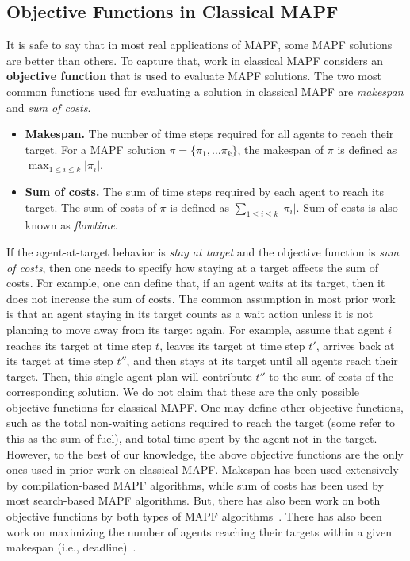 \documentclass[letterpaper]{article} %
\begin{document}
\subsection{Objective Functions in Classical MAPF}
It is safe to say that in most real applications of MAPF,
some MAPF solutions are better than others.
To capture that, work in classical MAPF considers an \textbf{objective function}
that is used to evaluate MAPF solutions.
The two most common functions used for evaluating a solution in classical MAPF are \emph{makespan} and \emph{sum of costs}.
\begin{itemize}
\item \textbf{Makespan.} The number of time steps required for all agents to reach their target.
For a MAPF solution $\pi=\{\pi_1, \ldots \pi_k\}$, the makespan of $\pi$ is defined as $\max_{1\leq i\leq k} |\pi_i|$.
\item \textbf{Sum of costs.} The sum of time steps required by each agent to reach its target. The sum of costs of $\pi$ is defined as $\sum_{1\leq i\leq k} |\pi_i|$.
Sum of costs is also known as \emph{flowtime}.
\end{itemize}
If the agent-at-target behavior is \emph{stay at target} and the objective function is \emph{sum of costs}, then one needs to specify how  staying at a target affects the sum of costs. For example, one can define that, if an agent waits at its target, then it does not increase the sum of costs. The common assumption in most prior work is that an agent staying in its target counts as a wait action unless it is not planning to move away from its target again. For example, assume that agent $i$ reaches its target at time step $t$, leaves its target at time step $t'$, arrives back at its target at time step $t''$,
and then stays at its target until all agents reach their target.
Then, this single-agent plan will contribute $t''$ to the sum of costs of the corresponding solution.
We do not claim that these are the only possible objective functions for classical MAPF.
One may define other objective functions, such as the total non-waiting actions required to reach the target (some refer to this as the sum-of-fuel), and total time spent by the agent not in the target.
However, to the best of our knowledge, the above objective functions are the only ones used in prior work on classical MAPF. Makespan has been used extensively by compilation-based MAPF algorithms, while sum of costs has been used by most search-based MAPF algorithms. But, there has also been work on both objective functions by both types of MAPF algorithms~\cite{surynek2016empirical}. There has also been work on maximizing the number of agents reaching their targets within a given makespan (i.e., deadline)~\cite{MaIJCAI18}.
\end{document}
